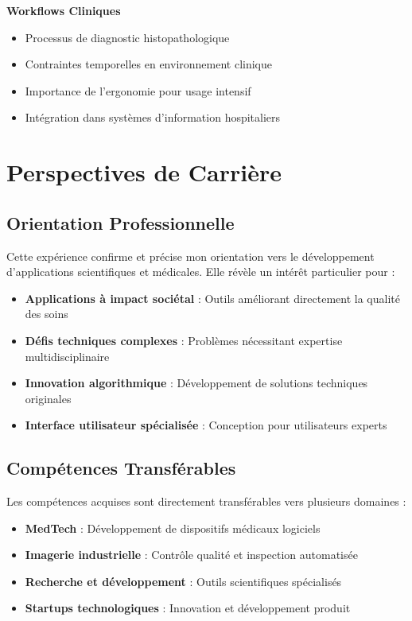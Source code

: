 \documentclass[12pt,a4paper]{report}
\begin{document}
\textbf{Workflows Cliniques}
\begin{itemize}
\item Processus de diagnostic histopathologique
\item Contraintes temporelles en environnement clinique
\item Importance de l'ergonomie pour usage intensif
\item Intégration dans systèmes d'information hospitaliers
\end{itemize}

\section{Perspectives de Carrière}

\subsection{Orientation Professionnelle}

Cette expérience confirme et précise mon orientation vers le développement d'applications scientifiques et médicales. Elle révèle un intérêt particulier pour :

\begin{itemize}
\item \textbf{Applications à impact sociétal} : Outils améliorant directement la qualité des soins
\item \textbf{Défis techniques complexes} : Problèmes nécessitant expertise multidisciplinaire
\item \textbf{Innovation algorithmique} : Développement de solutions techniques originales
\item \textbf{Interface utilisateur spécialisée} : Conception pour utilisateurs experts
\end{itemize}

\subsection{Compétences Transférables}

Les compétences acquises sont directement transférables vers plusieurs domaines :

\begin{itemize}
\item \textbf{MedTech} : Développement de dispositifs médicaux logiciels
\item \textbf{Imagerie industrielle} : Contrôle qualité et inspection automatisée
\item \textbf{Recherche et développement} : Outils scientifiques spécialisés
\item \textbf{Startups technologiques} : Innovation et développement produit
\end{itemize}
\end{document}
